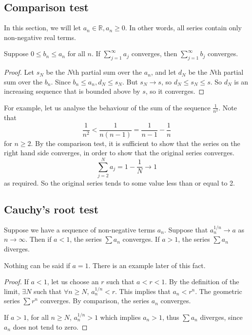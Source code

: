 \subsection{Comparison test}
In this section, we will let \(a_n \in \mathbb R, a_n \geq 0\).
In other words, all series contain only non-negative real terms.
\begin{theorem}
	Suppose \(0 \leq b_n \leq a_n\) for all \(n\).
	If \(\sum_{j=1}^\infty a_j\) converges, then \(\sum_{j=1}^\infty b_j\) converges.
\end{theorem}
\begin{proof}
	Let \(s_N\) be the \(N\)th partial sum over the \(a_n\), and let \(d_N\) be the \(N\)th partial sum over the \(b_n\).
	Since \(b_n \leq a_n, d_N \leq s_N\).
	But \(s_N \to s\), so \(d_N \leq s_N \leq s\).
	So \(d_N\) is an increasing sequence that is bounded above by \(s\), so it converges.
\end{proof}
\noindent For example, let us analyse the behaviour of the sum of the sequence \(\frac{1}{n^2}\).
Note that
\[
	\frac{1}{n^2} < \frac{1}{n(n-1)} = \frac{1}{n-1} - \frac{1}{n}
\]
for \(n \geq 2\).
By the comparison test, it is sufficient to show that the series on the right hand side converges, in order to show that the original series converges.
\[
	\sum_{j=2}^N a_j = 1 - \frac{1}{N} \to 1
\]
as required.
So the original series tends to some value less than or equal to 2.

\subsection{Cauchy's root test}
\begin{theorem}
	Suppose we have a sequence of non-negative terms \(a_n\).
	Suppose that \(a_n^{1/n} \to a\) as \(n \to \infty\).
	Then if \(a < 1\), the series \(\sum a_n\) converges.
	If \(a > 1\), the series \(\sum a_n\) diverges.
\end{theorem}
\begin{remark}
	Nothing can be said if \(a=1\).
	There is an example later of this fact.
\end{remark}
\begin{proof}
	If \(a < 1\), let us choose an \(r\) such that \(a < r < 1\).
	By the definition of the limit, \(\exists N\) such that \(\forall n \geq N\), \(a_n^{1/n} < r\).
	This implies that \(a_n < r^n\).
	The geometric series \(\sum r^n\) converges.
	By comparison, the series \(a_n\) converges.

	If \(a > 1\), for all \(n \geq N\), \(a_n^{1/n} > 1\) which implies \(a_n > 1\), thus \(\sum a_n\) diverges, since \(a_n\) does not tend to zero.
\end{proof}

